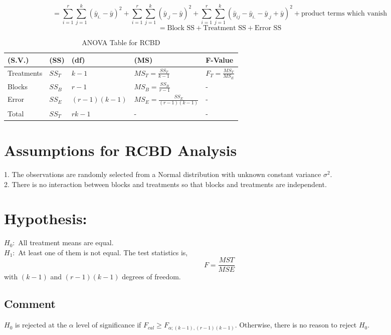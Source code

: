 \documentclass[oneside,12pt,fleqn]{book}
\begin{document}
\begin{equation}
= \sum_{i=1}^{r} \sum_{j=1}^{k} (\bar{y}_{i.} - \bar{y})^2 + \sum_{i=1}^{r} \sum_{j=1}^{k} (\bar{y}_{.j} - \bar{y})^2 + \sum_{i=1}^{r} \sum_{j=1}^{k} (\bar{y}_{ij} - \bar{y}_{i.} - \bar{y}_{.j} + \bar{y})^2 + \text{product terms which vanish}
\end{equation}
\begin{equation}
= \text{Block SS} + \text{Treatment SS} + \text{Error SS}
\end{equation}
\begin{table}[ht]
\centering
\begin{tabularx}{\textwidth}{|l|X|X|X|X|}
\hline
\textbf{(S.V.)} & \textbf{(SS)} & \textbf{(df)} & \textbf{(MS)} & \textbf{F-Value} \\ \hline
Treatments & \( SS_T \) & \( k - 1 \) & \( MS_T = \frac{SS_T}{k - 1} \) & \( F_T = \frac{MS_T}{MS_E} \) \\ \hline
Blocks & \( SS_B \) & \( r - 1 \) & \( MS_B = \frac{SS_B}{r - 1} \) & - \\ \hline
Error & \( SS_E \) & \( (r - 1)(k - 1) \) & \( MS_E = \frac{SS_E}{(r - 1)(k - 1)} \) & - \\ \hline
Total & \( SS_T \) & \( rk - 1 \) & - & - \\ \hline
 \end{tabularx}
\caption{ANOVA Table for RCBD}
\label{tab:anova_rcbd}
\end{table}
\section{Assumptions for RCBD Analysis}

1. The observations are randomly selected from a Normal distribution with unknown constant variance \( \sigma^2 \). \\
2. There is no interaction between blocks and treatments so that blocks and treatments are independent.
\section*{Hypothesis:}
$H_0 :$ All treatment means are equal.\\
$H_1 :$ At least one of them is not equal.
The test statistics is,
\[
F = \frac{MST}{MSE}
\]
with \((k-1)\) and \((r-1)(k-1)\) degrees of freedom.
\subsection*{Comment}
\(H_0\) is rejected at the \(\alpha\) level of significance if \(F_{cal} \geq F_{\alpha;(k-1),(r-1)(k-1)}\). Otherwise, there is no reason to reject \(H_0\).
\end{document}
